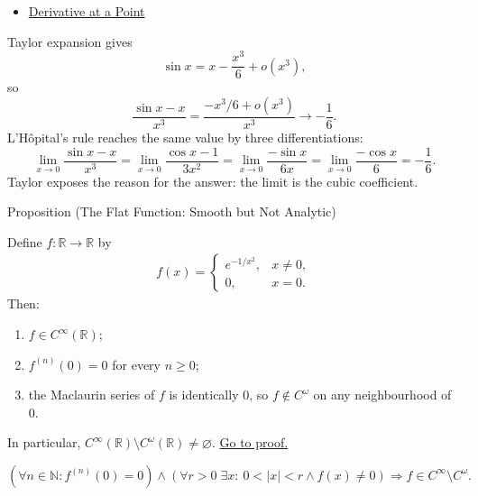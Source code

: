 \begin{dependencies}
\begin{itemize}
  \item \hyperref[def:derivative-at-a-point]{Derivative at a Point}
\end{itemize}
\end{dependencies}

\begin{exposition}
\label{ex:sinx-limit}
Taylor expansion gives
\[
  \sin x=x-\frac{x^3}{6}+o(x^3),
\]
so
\[
  \frac{\sin x-x}{x^3}
  =
  \frac{-x^3/6+o(x^3)}{x^3}
  \longrightarrow
  -\frac16.
\]
L'H\^{o}pital's rule reaches the same value by three differentiations:
\[
  \lim_{x\to0}\frac{\sin x-x}{x^3}
  =
  \lim_{x\to0}\frac{\cos x-1}{3x^2}
  =
  \lim_{x\to0}\frac{-\sin x}{6x}
  =
  \lim_{x\to0}\frac{-\cos x}{6}
  =
  -\frac16.
\]
Taylor exposes the reason for the answer: the limit is the cubic coefficient.
\end{exposition}


\begin{propositionbox}{Proposition (The Flat Function: Smooth but Not Analytic)}
\begin{proposition}
\label{prop:flat-function}
Define \(f:\mathbb{R}\to\mathbb{R}\) by
\[
\begin{aligned}
  f(x)=
  \begin{cases}
    e^{-1/x^2}, & x\neq 0,\\
    0, & x=0.
  \end{cases}
\end{aligned}
\]
Then:
\begin{enumerate}
  \item \(f\in C^\infty(\mathbb{R})\);
  \item \(f^{(n)}(0)=0\) for every \(n\geq 0\);
  \item the Maclaurin series of \(f\) is identically \(0\), so \(f\notin C^\omega\) on any neighbourhood of \(0\).
\end{enumerate}
In particular, \(C^\infty(\mathbb{R})\setminus C^\omega(\mathbb{R})\neq\varnothing\).
\hyperref[prf:flat-function]{Go to proof.}
\end{proposition}
\end{propositionbox}

\begin{remark*}
\[
  \left(
  \forall n\in\mathbb{N}: f^{(n)}(0)=0
  \right)
  \land
  \left(
  \forall r>0\;\exists x:\ 0<|x|<r\land f(x)\neq 0
  \right)
  \Longrightarrow
  f\in C^\infty\setminus C^\omega.
\]
\end{remark*}

